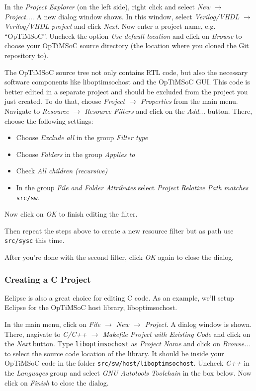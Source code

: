 In the \emph{Project Explorer} (on the left side), right click and select
\emph{New $\rightarrow$ Project...}. A new dialog window shows. In this window,
select \emph{Verilog/VHDL $\rightarrow$ Verilog/VHDL project} and click
\emph{Next}. Now enter a project name, e.g. ``OpTiMSoC''. Uncheck the option
\emph{Use default location} and click on \emph{Browse} to choose your OpTiMSoC
source directory (the location where you cloned the Git repository to).

The OpTiMSoC source tree not only contains RTL code, but also the necessary
software components like liboptimsochost and the OpTiMSoC GUI. This code is
better edited in a separate project and should be excluded from the project you
just created. To do that, choose \emph{Project $\rightarrow$
Properties} from the main menu. Navigate to \emph{Resource $\rightarrow$
Resource Filters} and click on the \emph{Add...} button. There, choose the
following settings:
\begin{itemize}
 \item Choose \emph{Exclude all} in the group \emph{Filter type}
 \item Choose \emph{Folders} in the group \emph{Applies to}
 \item Check \emph{All children (recursive)}
 \item In the group \emph{File and Folder Attributes} select
\emph{Project Relative Path} \emph{matches} \verb|src/sw|.
\end{itemize}
Now click on \emph{OK} to finish editing the filter.

Then repeat the steps above to create a new resource filter but as path
use \verb|src/sysc| this time.

After you're done with the second filter, click \emph{OK} again to
close the dialog.

\subsubsection{Creating a C Project}

Eclipse is also a great choice for editing C code. As an example, we'll setup
Eclipse for the OpTiMSoC host library, liboptimsochost.

In the main menu, click on \emph{File $\rightarrow$ New $\rightarrow$ Project}.
A dialog window is shown. There, nagivate to \emph{C/C++ $\rightarrow$ Makefile
Project with Existing Code} and click on the \emph{Next} button. Type
\verb|liboptimsochost| as \emph{Project Name} and click on \emph{Browse...} to
select the source code location of the library. It should be inside your
OpTiMSoC code in the folder \verb|src/sw/host/liboptimsochost|. Uncheck
\emph{C++} in the \emph{Languages} group and select \emph{GNU Autotools
Toolchain} in the box below. Now click on \emph{Finish} to close the dialog.

